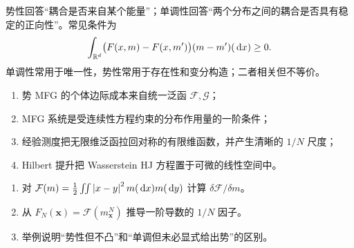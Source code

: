 势性回答“耦合是否来自某个能量”；单调性回答“两个分布之间的耦合是否具有稳定的正向性”。常见条件为
\[
\int_{\mathbb{R}^d}\bigl(F(x,m)-F(x,m')\bigr)(m-m')(\,\mathrm{d} x)\ge0.
\]
单调性常用于唯一性，势性常用于存在性和变分构造；二者相关但不等价。

\begin{takeaway}
\begin{enumerate}
  \item 势 MFG 的个体边际成本来自统一泛函 $\mathcal F,\mathcal G$；
  \item MFG 系统是受连续性方程约束的分布作用量的一阶条件；
  \item 经验测度把无限维泛函拉回对称的有限维函数，并产生清晰的 $1/N$ 尺度；
  \item Hilbert 提升把 Wasserstein HJ 方程置于可微的线性空间中。
\end{enumerate}
\end{takeaway}

\begin{exercisebox}
\begin{enumerate}
  \item 对 $\mathcal F(m)=\tfrac12\iint\left\lvert x-y\right\rvert^2m(\,\mathrm{d} x)m(\,\mathrm{d} y)$ 计算 $\delta\mathcal F/\delta m$。
  \item 从 $F_N(\symbf{x})=\mathcal F(m_{\symbf{x}}^N)$ 推导一阶导数的 $1/N$ 因子。
  \item 举例说明“势性但不凸”和“单调但未必显式给出势”的区别。
\end{enumerate}
\end{exercisebox}
